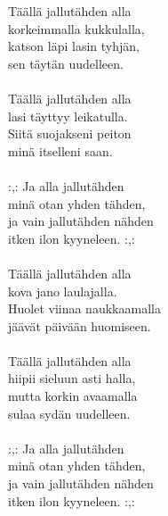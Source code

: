 
            Täällä jallutähden alla \\
            korkeimmalla kukkulalla, \\
            katson läpi lasin tyhjän, \\
            sen täytän uudelleen. \\
\hspace{10mm} \\
            Täällä jallutähden alla \\
            lasi täyttyy leikatulla. \\
            Siitä suojakseni peiton \\
            minä itselleni saan. \\
\hspace{10mm} \\
            :,: Ja alla jallutähden \\
            minä otan yhden tähden, \\
            ja vain jallutähden nähden \\
            itken ilon kyyneleen. :,: \\
\hspace{10mm} \\
            Täällä jallutähden alla \\
            kova jano laulajalla. \\
            Huolet viinaa naukkaamalla \\
            jäävät päivään huomiseen. \\
\hspace{10mm} \\
            Täällä jallutähden alla \\
            hiipii sieluun asti halla, \\
            mutta korkin avaamalla \\
            sulaa sydän uudelleen. \\
\hspace{10mm} \\
            :,: Ja alla jallutähden \\
            minä otan yhden tähden, \\
            ja vain jallutähden nähden \\
            itken ilon kyyneleen. :,: \\
